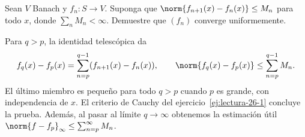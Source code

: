 \begin{ejercicio}\label{ej:lectura-26-4}
Sean $V$ Banach y $f_n:S\to V$. Suponga que $\norm{f_{n+1}(x)-f_n(x)}\le M_n$ para todo $x$, donde $\sum_nM_n<\infty$. Demuestre que $(f_n)$ converge uniformemente.
\end{ejercicio}
\begin{solucion}
Para $q>p$, la identidad telescópica da
\[
 f_q(x)-f_p(x)=\sum_{n=p}^{q-1}(f_{n+1}(x)-f_n(x)),
 \qquad \norm{f_q(x)-f_p(x)}\le\sum_{n=p}^{q-1}M_n.
\]
El último miembro es pequeño para todo $q>p$ cuando $p$ es grande, con independencia de $x$. El criterio de Cauchy del ejercicio~\ref{ej:lectura-26-1} concluye la prueba. Además, al pasar al límite $q\to\infty$ obtenemos la estimación útil $\norm{f-f_p}_\infty\le\sum_{n=p}^\infty M_n$.
\end{solucion}

